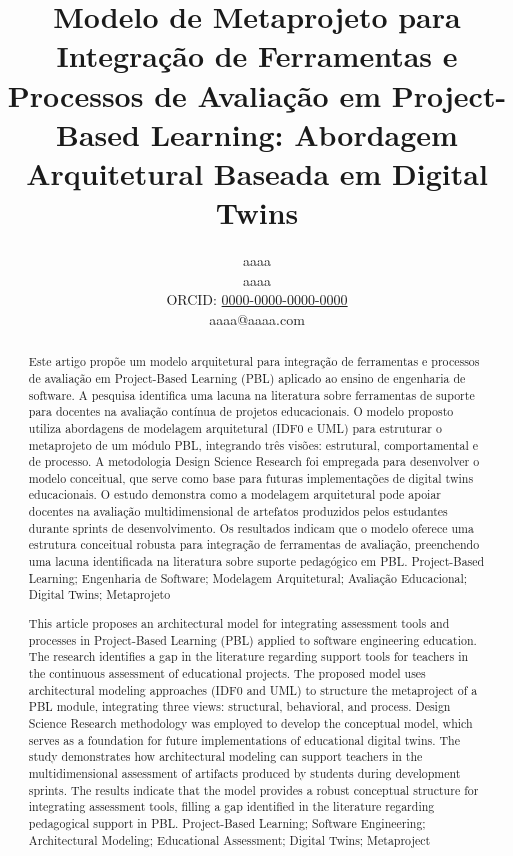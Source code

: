 \documentclass[english, spanish, brazilian]{RBIEarticle} %
\title{Modelo de Metaprojeto para Integração de Ferramentas e Processos de Avaliação em Project-Based Learning: Abordagem Arquitetural Baseada em Digital Twins}
\author{%
	\parbox{8cm}{%
		aaaa\\
		aaaa\\
		ORCID: \href{https://orcid.org/0000-0000-0000-0000}{0000-0000-0000-0000}\\
		aaaa@aaaa.com
	}
}
\begin{document}
\maketitle

\begin{otherlanguage}{brazilian}
\begin{abstract}
Este artigo propõe um modelo arquitetural para integração de ferramentas e processos de avaliação em Project-Based Learning (PBL) aplicado ao ensino de engenharia de software. A pesquisa identifica uma lacuna na literatura sobre ferramentas de suporte para docentes na avaliação contínua de projetos educacionais. O modelo proposto utiliza abordagens de modelagem arquitetural (IDF0 e UML) para estruturar o metaprojeto de um módulo PBL, integrando três visões: estrutural, comportamental e de processo. A metodologia Design Science Research foi empregada para desenvolver o modelo conceitual, que serve como base para futuras implementações de digital twins educacionais. O estudo demonstra como a modelagem arquitetural pode apoiar docentes na avaliação multidimensional de artefatos produzidos pelos estudantes durante sprints de desenvolvimento. Os resultados indicam que o modelo oferece uma estrutura conceitual robusta para integração de ferramentas de avaliação, preenchendo uma lacuna identificada na literatura sobre suporte pedagógico em PBL.
\keywords Project-Based Learning; Engenharia de Software; Modelagem Arquitetural; Avaliação Educacional; Digital Twins; Metaprojeto
\end{abstract}
\end{otherlanguage}

\begin{otherlanguage}{english}
\begin{abstract}
This article proposes an architectural model for integrating assessment tools and processes in Project-Based Learning (PBL) applied to software engineering education. The research identifies a gap in the literature regarding support tools for teachers in the continuous assessment of educational projects. The proposed model uses architectural modeling approaches (IDF0 and UML) to structure the metaproject of a PBL module, integrating three views: structural, behavioral, and process. Design Science Research methodology was employed to develop the conceptual model, which serves as a foundation for future implementations of educational digital twins. The study demonstrates how architectural modeling can support teachers in the multidimensional assessment of artifacts produced by students during development sprints. The results indicate that the model provides a robust conceptual structure for integrating assessment tools, filling a gap identified in the literature regarding pedagogical support in PBL.
\keywords Project-Based Learning; Software Engineering; Architectural Modeling; Educational Assessment; Digital Twins; Metaproject
\end{abstract}
\end{otherlanguage}
\end{document}
